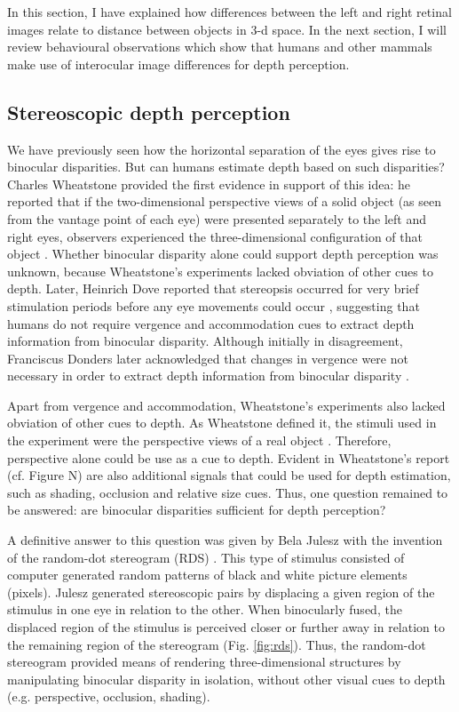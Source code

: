 In this section, I have explained how differences between the left and right retinal images relate to distance between objects in 3-d space. In the next section, I will review behavioural observations which show that humans and other mammals make use of interocular image differences for depth perception.

\subsection{Stereoscopic depth perception}

We have previously seen how the horizontal separation of the eyes gives rise to binocular disparities. But can humans estimate depth based on such disparities? Charles Wheatstone provided the first evidence in support of this idea: he reported that if the two-dimensional perspective views of a solid object (as seen from the vantage point of each eye) were presented separately to the left and right eyes, observers experienced the three-dimensional configuration of that object \cite{Wheatstone:1838xf}. Whether binocular disparity alone could support depth perception was unknown, because Wheatstone's experiments lacked obviation of other cues to depth. Later, Heinrich Dove reported that stereopsis occurred for very brief stimulation periods before any eye movements could occur \cite{Dove1841,Dove1860}, suggesting that humans do not require vergence and accommodation cues to extract depth information from binocular disparity. Although initially in disagreement, Franciscus Donders later acknowledged that changes in vergence were not necessary in order to extract depth information from binocular disparity \cite{Donders1867}.

Apart from vergence and accommodation, Wheatstone's experiments also lacked obviation of other cues to depth. As Wheatstone defined it, the stimuli used in the experiment were the perspective views of a real object \cite{Wheatstone:1838xf}. Therefore, perspective alone could be use as a cue to depth. Evident in Wheatstone's report \cite{Wheatstone:1838xf} (cf. Figure N) are also additional signals that could be used for depth estimation, such as shading, occlusion and relative size cues. Thus, one question remained to be answered: are binocular disparities sufficient for depth perception?

A definitive answer to this question was given by Bela Julesz with the invention of the random-dot stereogram (RDS) \cite{JULESZ:1964ff}. This type of stimulus consisted of computer generated random patterns of black and white picture elements (pixels). Julesz generated stereoscopic pairs by displacing a given region of the stimulus in one eye in relation to the other. When binocularly fused, the displaced region of the stimulus is perceived closer or further away in relation to the remaining region of the stereogram (Fig. \ref{fig:rds}). Thus, the random-dot stereogram provided means of rendering three-dimensional structures by manipulating binocular disparity in isolation, without other visual cues to depth (e.g. perspective, occlusion, shading).


